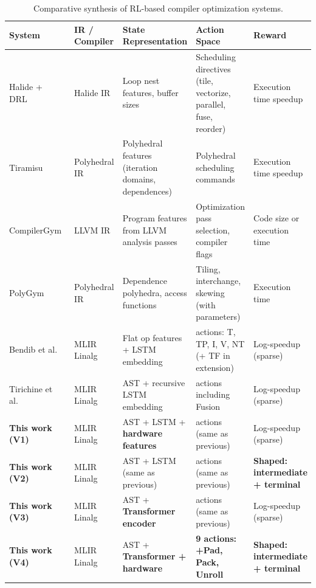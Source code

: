 \begin{table}[H]
    \centering
    \caption{Comparative synthesis of RL-based compiler optimization systems.}
    \label{tab:related-work-synthesis}
    \begin{tabularx}{\textwidth}{l >{\raggedright\arraybackslash}p{2.8cm} >{\raggedright\arraybackslash}p{2.8cm} >{\raggedright\arraybackslash}p{2.8cm} >{\raggedright\arraybackslash}p{2.8cm}}
        \toprule
        \textbf{System} & \textbf{IR / Compiler} & \textbf{State Representation} & \textbf{Action Space} & \textbf{Reward} \\
        \midrule
        Halide + DRL~\cite{pecenin2019halide}
        & Halide IR
        & Loop nest features, buffer sizes
        & Scheduling directives (tile, vectorize, parallel, fuse, reorder)
        & Execution time speedup \\
        \addlinespace
        Tiramisu~\cite{lamouri2024tiramisu}
        & Polyhedral IR
        & Polyhedral features (iteration domains, dependences)
        & Polyhedral scheduling commands
        & Execution time speedup \\
        \addlinespace
        CompilerGym~\cite{cummins2021compilergym}
        & LLVM IR
        & Program features from LLVM analysis passes
        & Optimization pass selection, compiler flags
        & Code size or execution time \\
        \addlinespace
        PolyGym~\cite{brauckmann2021polygym}
        & Polyhedral IR
        & Dependence polyhedra, access functions
        & Tiling, interchange, skewing (with parameters)
        & Execution time \\
        \addlinespace
        Bendib et al.~\cite{bendib2024reinforcement}
        & MLIR Linalg
        & Flat op features + LSTM embedding
        & 6 actions: T, TP, I, V, NT (+ TF in extension)
        & Log-speedup (sparse) \\
        \addlinespace
        Tirichine et al.~\cite{tirichine2025reinforcement}
        & MLIR Linalg
        & AST + recursive LSTM embedding
        & 6 actions including Fusion
        & Log-speedup (sparse) \\
        \addlinespace
        \textbf{This work (V1)}
        & MLIR Linalg
        & AST + LSTM + \textbf{hardware features}
        & 6 actions (same as previous)
        & Log-speedup (sparse) \\
        \addlinespace
        \textbf{This work (V2)}
        & MLIR Linalg
        & AST + LSTM (same as previous)
        & 6 actions (same as previous)
        & \textbf{Shaped: intermediate + terminal} \\
        \addlinespace
        \textbf{This work (V3)}
        & MLIR Linalg
        & AST + \textbf{Transformer encoder}
        & 6 actions (same as previous)
        & Log-speedup (sparse) \\
        \addlinespace
        \textbf{This work (V4)}
        & MLIR Linalg
        & AST + \textbf{Transformer + hardware}
        & \textbf{9 actions: +Pad, Pack, Unroll}
        & \textbf{Shaped: intermediate + terminal} \\
        \bottomrule
    \end{tabularx}
\end{table}


